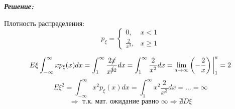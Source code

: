 \noindent\textit{\textbf{Решение:}}

Плотность распределения:
\[
p_{\xi} =
\begin{cases}
0, & x < 1 \\
\frac{2}{x^3}, &x \ge 1
\end{cases}
\]

\[
E\xi \int_{-\infty}^{\infty} x p_{\xi} (x) dx = \int_{1}^{\infty} \frac{2\cancel{x}}{x^{\cancel{3}2}} dx = \int_{1}^{\infty} \frac{2}{x^2} dx = \lim_{a \to \infty} \left(-\frac{2}{x}\right) \bigg|_{1}^a = 2
\]
\[
E\xi^2 = \int_{-\infty}^{\infty} x^2 p_{\xi}(x) dx = \int_{1}^{\infty} x^2 \frac{2}{x^3} dx = \dots = \infty
\]
\[
\Rightarrow \text{ т.к. мат. ожидание равно } \infty \Rightarrow \nexists D\xi 
\]

 